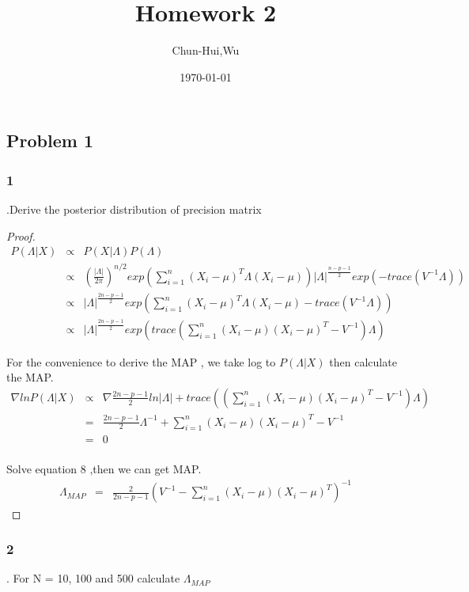 \documentclass{article}
\title{Homework 2}
\author{Chun-Hui,Wu}
\date\today
\begin{document}
\maketitle %



\subsection*{Problem 1}
\subsubsection*{1}.Derive the posterior distribution of precision matrix 
\begin{proof}
\begin{eqnarray}
   P(\Lambda | X) & \propto &  P(X|\Lambda)P(\Lambda)\\
   	                                  &\propto& (\frac{|\Lambda|}{2\pi})^{n/2} exp(\sum_{i=1}^n (X_i-\mu)^T\Lambda(X_i-\mu))|\Lambda|^{\frac{n-p-1}{2}}exp(-trace(V^{-1}\Lambda)) \\
                                       &\propto& |\Lambda|^{\frac{2n-p-1}{2}}exp( \sum_{i=1}^n (X_i-\mu)^T\Lambda(X_i-\mu)-trace(V^{-1}\Lambda))\\
                                       &\propto& |\Lambda|^{\frac{2n-p-1}{2}}exp(trace( \sum_{i=1}^n (X_i-\mu)(X_i-\mu)^T-V^{-1})\Lambda )
\end{eqnarray}

For the convenience to derive the MAP , we take log to $P(\Lambda | X)$ then calculate the MAP.
\begin{eqnarray}
   \nabla lnP(\Lambda | X) & \propto & \nabla \frac{2n-p-1}{2}ln|\Lambda| + trace( (\sum_{i=1}^n (X_i-\mu)(X_i-\mu)^T-V^{-1})\Lambda) \\
   	                                  &=& \frac{2n-p-1}{2} \Lambda^{-1} + \sum_{i=1}^n (X_i-\mu)(X_i-\mu)^T-V^{-1} \\
                                       &=& 0\\
\end{eqnarray}

Solve equation 8 ,then we can get MAP.
\begin{eqnarray}
  \Lambda_{MAP}  &= & \frac{2}{2n-p-1} (V^{-1}- \sum_{i=1}^n (X_i-\mu)(X_i-\mu)^T)^{-1}                      
\end{eqnarray}
\end{proof}
\subsubsection*{2}. For N = 10, 100 and 500 calculate $\Lambda_{MAP}$
\end{document}
